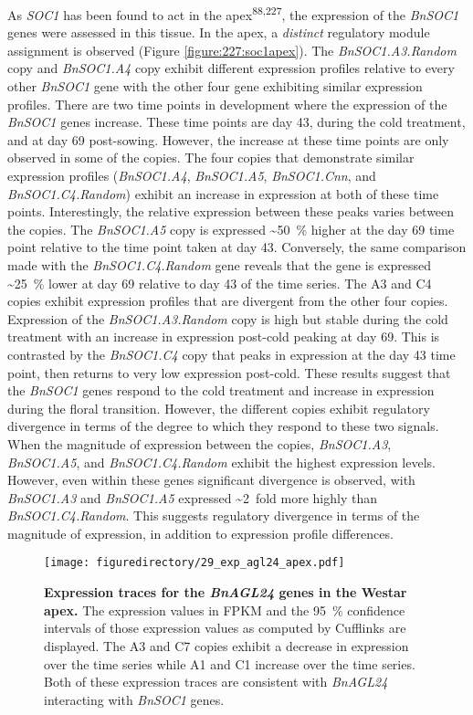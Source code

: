 \documentclass[12pt,]{book}
\begin{document}
As \emph{SOC1} has been found to act in the
apex\textsuperscript{88,227}, the expression of the \emph{BnSOC1} genes
were assessed in this tissue. In the apex, a \emph{distinct} regulatory
module assignment is observed (Figure \ref{figure:227:soc1apex}). The
\emph{BnSOC1.A3.Random} copy and \emph{BnSOC1.A4} copy exhibit different
expression profiles relative to every other \emph{BnSOC1} gene with the
other four gene exhibiting similar expression profiles. There are two
time points in development where the expression of the \emph{BnSOC1}
genes increase. These time points are day 43, during the cold treatment,
and at day 69 post-sowing. However, the increase at these time points
are only observed in some of the copies. The four copies that
demonstrate similar expression profiles (\emph{BnSOC1.A4},
\emph{BnSOC1.A5}, \emph{BnSOC1.Cnn}, and \emph{BnSOC1.C4.Random})
exhibit an increase in expression at both of these time points.
Interestingly, the relative expression between these peaks varies
between the copies. The \emph{BnSOC1.A5} copy is expressed
\textasciitilde{}50~\% higher at the day 69 time point relative to the
time point taken at day 43. Conversely, the same comparison made with
the \emph{BnSOC1.C4.Random} gene reveals that the gene is expressed
\textasciitilde{}25~\% lower at day 69 relative to day 43 of the time
series. The A3 and C4 copies exhibit expression profiles that are
divergent from the other four copies. Expression of the
\emph{BnSOC1.A3.Random} copy is high but stable during the cold
treatment with an increase in expression post-cold peaking at day 69.
This is contrasted by the \emph{BnSOC1.C4} copy that peaks in expression
at the day 43 time point, then returns to very low expression post-cold.
These results suggest that the \emph{BnSOC1} genes respond to the cold
treatment and increase in expression during the floral transition.
However, the different copies exhibit regulatory divergence in terms of
the degree to which they respond to these two signals. When the
magnitude of expression between the copies, \emph{BnSOC1.A3},
\emph{BnSOC1.A5}, and \emph{BnSOC1.C4.Random} exhibit the highest
expression levels. However, even within these genes significant
divergence is observed, with \emph{BnSOC1.A3} and \emph{BnSOC1.A5}
expressed \textasciitilde{}2~fold more highly than
\emph{BnSOC1.C4.Random}. This suggests regulatory divergence in terms of
the magnitude of expression, in addition to expression profile
differences.

\begin{figure}[htbp]
\centering
\texttt{[image: figuredirectory/29\_exp\_agl24\_apex.pdf]}
\caption{\textbf{Expression traces for the \emph{BnAGL24} genes in the
Westar apex.} The expression values in FPKM and the 95~\% confidence
intervals of those expression values as computed by Cufflinks are
displayed. The A3 and C7 copies exhibit a decrease in expression over
the time series while A1 and C1 increase over the time series. Both of
these expression traces are consistent with \emph{BnAGL24} interacting
with \emph{BnSOC1} genes.}\label{figure:229:agl24apex}
\end{figure}
\end{document}

